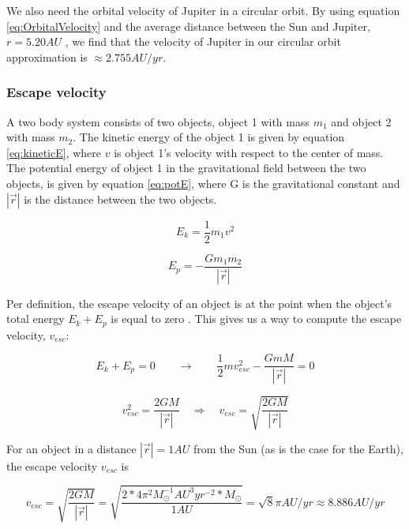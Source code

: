 \documentclass[norsk,a4paper,12pt]{article}
\begin{document}
We also need the orbital velocity of Jupiter in a circular orbit. By using equation \ref{eq:OrbitalVelocity} and the average distance between the Sun and Jupiter, $r = 5.20 AU$ \cite{Project_text}, we find that the velocity of Jupiter in our circular orbit approximation is $\approx 2.755 AU/yr$.

\subsubsection{Escape velocity}
A two body system consists of two objects, object 1 with mass $m_1$ and object 2 with mass $m_2$. The kinetic energy of the object 1 is given by equation \ref{eq:kineticE}, where $v$ is object 1's velocity with respect to the center of mass. The potential energy of object 1 in the gravitational field between the two objects, is given by equation \ref{eq:potE}, where G is the gravitational constant and $|\vec{r}|$ is the distance between the two objects. 

\begin{equation}
    E_k = \frac{1}{2} m_1 v^2
    \label{eq:kineticE}
\end{equation}

\begin{equation}
    E_p = - \frac{G m_1 m_2}{|\vec{r}|}
    \label{eq:potE}
\end{equation}
\par 
\vspace{3mm}

Per definition, the escape velocity of an object is at the point when the object's total energy $E_k + E_p$ is equal to zero \cite{kepler}. This gives us a way to compute the escape velocity, $v_{esc}$:

\begin{equation*}
    E_k + E_p = 0 \qquad \rightarrow \qquad \frac{1}{2} m v_{esc}^2 - \frac{G m M}{|\vec{r}|} = 0
\end{equation*}

\begin{equation}
     v_{esc}^2 = \frac{2 G M}{|\vec{r}|} \quad \Rightarrow \quad v_{esc} = \sqrt{\frac{2 G M}{|\vec{r}|}}
     \label{esc_v}
\end{equation}

For an object in a distance $|\vec{r}| = 1AU$ from the Sun (as is the case for the Earth), the escape velocity $v_{esc}$ is 

\begin{equation*}
    v_{esc} = \sqrt{\frac{2 G M}{|\vec{r}|}} = \sqrt{\frac{2 * 4\pi^2 M_{\odot} ^{-1} AU^3 yr^{-2} * M_{\odot}}{1 AU}} = \sqrt{8}\pi AU/yr \approx 8.886 AU/yr
\end{equation*}
\end{document}
